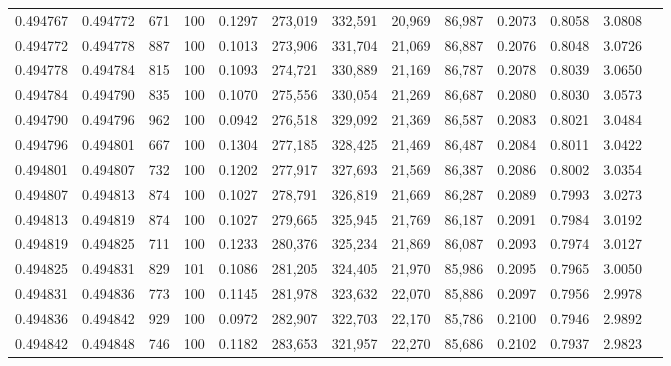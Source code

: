 \begin{tabular}{rrrrrrrrrrrrr}
0.494767 & 0.494772 &   671 & 100 &                                     0.1297 & 273,019 & 332,591 &  20,969 &  86,987 & 0.2073 & 0.8058 & 3.0808 \\
0.494772 & 0.494778 &   887 & 100 &                                     0.1013 & 273,906 & 331,704 &  21,069 &  86,887 & 0.2076 & 0.8048 & 3.0726 \\
0.494778 & 0.494784 &   815 & 100 &                                     0.1093 & 274,721 & 330,889 &  21,169 &  86,787 & 0.2078 & 0.8039 & 3.0650 \\
0.494784 & 0.494790 &   835 & 100 &                                     0.1070 & 275,556 & 330,054 &  21,269 &  86,687 & 0.2080 & 0.8030 & 3.0573 \\
0.494790 & 0.494796 &   962 & 100 &                                     0.0942 & 276,518 & 329,092 &  21,369 &  86,587 & 0.2083 & 0.8021 & 3.0484 \\
0.494796 & 0.494801 &   667 & 100 &                                     0.1304 & 277,185 & 328,425 &  21,469 &  86,487 & 0.2084 & 0.8011 & 3.0422 \\
0.494801 & 0.494807 &   732 & 100 &                                     0.1202 & 277,917 & 327,693 &  21,569 &  86,387 & 0.2086 & 0.8002 & 3.0354 \\
0.494807 & 0.494813 &   874 & 100 &                                     0.1027 & 278,791 & 326,819 &  21,669 &  86,287 & 0.2089 & 0.7993 & 3.0273 \\
0.494813 & 0.494819 &   874 & 100 &                                     0.1027 & 279,665 & 325,945 &  21,769 &  86,187 & 0.2091 & 0.7984 & 3.0192 \\
0.494819 & 0.494825 &   711 & 100 &                                     0.1233 & 280,376 & 325,234 &  21,869 &  86,087 & 0.2093 & 0.7974 & 3.0127 \\
0.494825 & 0.494831 &   829 & 101 &                                     0.1086 & 281,205 & 324,405 &  21,970 &  85,986 & 0.2095 & 0.7965 & 3.0050 \\
0.494831 & 0.494836 &   773 & 100 &                                     0.1145 & 281,978 & 323,632 &  22,070 &  85,886 & 0.2097 & 0.7956 & 2.9978 \\
0.494836 & 0.494842 &   929 & 100 &                                     0.0972 & 282,907 & 322,703 &  22,170 &  85,786 & 0.2100 & 0.7946 & 2.9892 \\
0.494842 & 0.494848 &   746 & 100 &                                     0.1182 & 283,653 & 321,957 &  22,270 &  85,686 & 0.2102 & 0.7937 & 2.9823 \\

\end{tabular}
